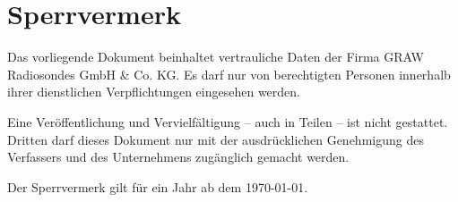 \section*{Sperrvermerk}
Das vorliegende Dokument beinhaltet vertrauliche Daten der Firma GRAW Radiosondes GmbH \& Co. KG.
Es darf nur von berechtigten Personen innerhalb ihrer dienstlichen Verpflichtungen eingesehen werden.

Eine Veröffentlichung und Vervielfältigung – auch in Teilen – ist nicht gestattet.
Dritten darf dieses Dokument nur mit der ausdrücklichen Genehmigung des Verfassers und des Unternehmens zugänglich gemacht werden.

Der Sperrvermerk gilt für ein Jahr ab dem \today.
